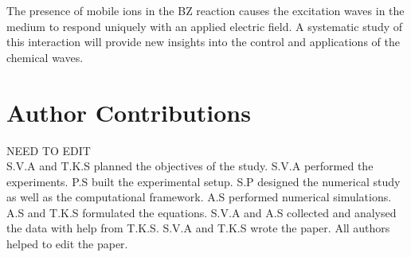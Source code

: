 \documentclass[%
 reprint,
 amsmath,amssymb,
 aps,
prb,
]{revtex4-2}
\begin{document}
The presence of mobile ions in the BZ reaction causes the excitation waves in the medium to respond uniquely with an applied electric field. A systematic study of this interaction will provide new insights into the control and applications of the chemical waves.

\begin{acknowledgments}

\end{acknowledgments}

\section{Author Contributions}
	NEED TO EDIT\\
S.V.A and T.K.S planned the objectives of the study. S.V.A performed the experiments. P.S built the experimental setup. S.P designed the numerical study as well as the computational framework. A.S performed numerical simulations. A.S and T.K.S formulated the equations. S.V.A and A.S collected and analysed the data with help from T.K.S. S.V.A and T.K.S wrote the paper. All authors helped to edit the paper. 
\end{document}
